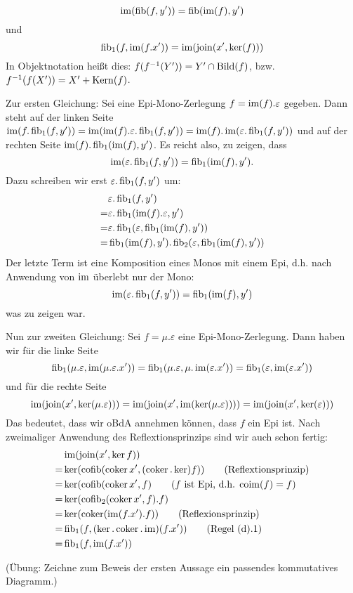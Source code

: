 \begin{lemm}[Regel (e)]
\[
\operatorname{im}(\operatorname{fib}(f,y')) = \operatorname{fib}(\operatorname{im}(f),y')
\]
und
\[
\operatorname{fib}_1(f,\operatorname{im}(f.x')) = \operatorname{im}(\operatorname{join}(x', \ker(f)))
\]
In Objektnotation heißt dies: $f(f^{-1}(Y')) = Y' \cap \operatorname{Bild}(f)$, bzw. $f^{-1}(f(X')) = X' + \operatorname{Kern}(f)$.
\end{lemm}
\begin{bew}
Zur ersten Gleichung:
Sei eine Epi-Mono-Zerlegung $f=\operatorname{im}(f).\varepsilon$ gegeben.
Dann steht auf der linken Seite $\operatorname{im}(f.\operatorname{fib}_1(f,y')) = \operatorname{im}(\operatorname{im}(f).\varepsilon.\operatorname{fib}_1(f,y')) = \operatorname{im}(f).\operatorname{im}(\varepsilon.\operatorname{fib}_1(f,y'))$ und auf der rechten Seite $\operatorname{im}(f).\operatorname{fib}_1(\operatorname{im}(f),y')$. Es reicht also, zu zeigen, dass
\[ \operatorname{im}(\varepsilon.\operatorname{fib}_1(f,y')) = \operatorname{fib}_1(\operatorname{im}(f),y'). \]
Dazu schreiben wir erst $\varepsilon.\operatorname{fib}_1(f,y')$ um:
\begin{align*}
&\varepsilon.\operatorname{fib}_1(f,y')
\\=& \varepsilon.\operatorname{fib}_1(\operatorname{im}(f).\varepsilon,y')
\\=& \varepsilon.\operatorname{fib}_1(\varepsilon,\operatorname{fib}_1(\operatorname{im}(f),y'))
\\=& \operatorname{fib}_1(\operatorname{im}(f),y').\operatorname{fib}_2(\varepsilon,\operatorname{fib}_1(\operatorname{im}(f),y'))
\end{align*}
Der letzte Term ist eine Komposition eines Monos mit einem Epi, d.h. nach Anwendung von $\operatorname{im}$ überlebt nur der Mono:
\[ \operatorname{im}(\varepsilon.\operatorname{fib}_1(f,y')) = \operatorname{fib}_1(\operatorname{im}(f),y') \]
was zu zeigen war.

Nun zur zweiten Gleichung:
Sei $f = \mu.\varepsilon$ eine Epi-Mono-Zerlegung. Dann haben wir für die linke Seite
\[ \operatorname{fib}_1(\mu.\varepsilon,\operatorname{im}(\mu.\varepsilon.x')) = \operatorname{fib}_1(\mu.\varepsilon, \mu.\operatorname{im}(\varepsilon.x')) = \operatorname{fib}_1(\varepsilon, \operatorname{im}(\varepsilon.x')) \]
und für die rechte Seite
\[ \operatorname{im}(\operatorname{join}(x',\ker(\mu.\varepsilon))) = \operatorname{im}(\operatorname{join}(x',\operatorname{im}(\ker(\mu.\varepsilon))))
= \operatorname{im}(\operatorname{join}(x',\ker(\varepsilon))) \]
Das bedeutet, dass wir oBdA annehmen können, dass $f$ ein Epi ist.
Nach zweimaliger Anwendung des Reflextionsprinzips sind wir auch schon fertig:
\begin{align*}
   & \operatorname{im}(\operatorname{join}(x',\ker f))
\\=& \ker(\operatorname{cofib}(\operatorname{coker} x', (\operatorname{coker} . \ker) f)) \qquad\text{(Reflextionsprinzip)}
\\=& \ker(\operatorname{cofib}(\operatorname{coker} x', f) \qquad \text{($f$ ist Epi, d.h. $\operatorname{coim}(f) = f$)}
\\=& \ker(\operatorname{cofib}_2(\operatorname{coker} x', f).f)
\\=& \ker(\operatorname{coker}(\operatorname{im}(f.x').f)) \qquad \text{(Reflexionsprinzip)}
\\=& \operatorname{fib}_1(f,(\ker.\operatorname{coker}.\operatorname{im})(f.x')) \qquad \text{(Regel (d).1)}
\\=& \operatorname{fib}_1(f,\operatorname{im}(f.x'))
\end{align*}

 
(Übung: Zeichne zum Beweis der ersten Aussage ein passendes kommutatives Diagramm.)
\end{bew}

